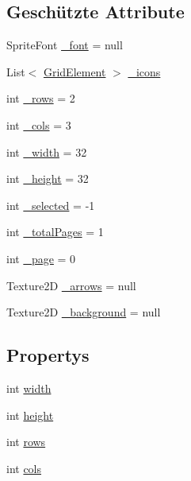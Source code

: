 \subsection*{Geschützte Attribute}
\begin{DoxyCompactItemize}
\item 
Sprite\-Font \hyperlink{class_gruppe22_1_1_client_1_1_grid_a0a38f9e91d0a62c3cf8b742535b74ad2}{\-\_\-font} = null
\item 
List$<$ \hyperlink{class_gruppe22_1_1_client_1_1_grid_element}{Grid\-Element} $>$ \hyperlink{class_gruppe22_1_1_client_1_1_grid_aa6c5b5d5d7f94edd9071c5bbd77ca24f}{\-\_\-icons}
\item 
int \hyperlink{class_gruppe22_1_1_client_1_1_grid_a933dd1b3b9af5be773bd921115c59feb}{\-\_\-rows} = 2
\item 
int \hyperlink{class_gruppe22_1_1_client_1_1_grid_a5287cb3e2ed085ccfd851f3191b2a765}{\-\_\-cols} = 3
\item 
int \hyperlink{class_gruppe22_1_1_client_1_1_grid_ad993356078eff457ab24454827b6a4e7}{\-\_\-width} = 32
\item 
int \hyperlink{class_gruppe22_1_1_client_1_1_grid_a9769cba7225642365ab38caf89cc1648}{\-\_\-height} = 32
\item 
int \hyperlink{class_gruppe22_1_1_client_1_1_grid_a009b6bc6c6f4eafc607ad05154a407ea}{\-\_\-selected} = -\/1
\item 
int \hyperlink{class_gruppe22_1_1_client_1_1_grid_a00a5a042cc916c2ccb61e71f22e2c4d8}{\-\_\-total\-Pages} = 1
\item 
int \hyperlink{class_gruppe22_1_1_client_1_1_grid_a75ea67703bd282282c9c52002912bff9}{\-\_\-page} = 0
\item 
Texture2\-D \hyperlink{class_gruppe22_1_1_client_1_1_grid_a737100c39b0ba0d03c8d0dd449785de7}{\-\_\-arrows} = null
\item 
Texture2\-D \hyperlink{class_gruppe22_1_1_client_1_1_grid_a260c6d7278902345b592e52ca0da4307}{\-\_\-background} = null
\end{DoxyCompactItemize}
\subsection*{Propertys}
\begin{DoxyCompactItemize}
\item 
int \hyperlink{class_gruppe22_1_1_client_1_1_grid_a711e8cb9cca1be9c8f3aff7c9ddbc450}{width}
\item 
int \hyperlink{class_gruppe22_1_1_client_1_1_grid_ae1646e8080a96020555b515e1935e5b1}{height}
\item 
int \hyperlink{class_gruppe22_1_1_client_1_1_grid_a3b4a827491fee188ce82f02746c39faf}{rows}
\item 
int \hyperlink{class_gruppe22_1_1_client_1_1_grid_a52da03d0cf902fd7c224b17fc95b82dd}{cols}
\end{DoxyCompactItemize}


